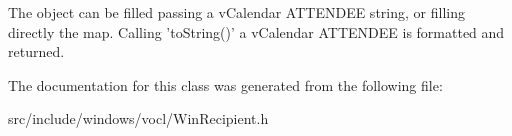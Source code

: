 The object can be filled passing a v\-Calendar ATTENDEE string, or filling directly the map. Calling 'to\-String()' a v\-Calendar ATTENDEE is formatted and returned. 



The documentation for this class was generated from the following file:\begin{CompactItemize}
\item 
src/include/windows/vocl/Win\-Recipient.h\end{CompactItemize}
